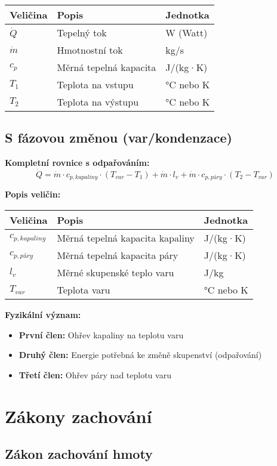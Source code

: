 \documentclass[11pt,a4paper]{article}
\begin{document}
\begin{longtable}{lll}
\toprule
Veličina & Popis & Jednotka \\
\midrule
$\dot{Q}$ & Tepelný tok & W (Watt) \\
$\dot{m}$ & Hmotnostní tok & kg/s \\
$c_p$ & Měrná tepelná kapacita & J/(kg·K) \\
$T_1$ & Teplota na vstupu & °C nebo K \\
$T_2$ & Teplota na výstupu & °C nebo K \\
\bottomrule
\end{longtable}

\subsection{S fázovou změnou (var/kondenzace)}

\textbf{Kompletní rovnice s odpařováním:}
\[\dot{Q} = \dot{m} \cdot c_{p,kapaliny} \cdot (T_{var} - T_1) + \dot{m} \cdot l_v + \dot{m} \cdot c_{p,páry} \cdot (T_2 - T_{var})\]

\textbf{Popis veličin:}

\begin{longtable}{lll}
\toprule
Veličina & Popis & Jednotka \\
\midrule
$c_{p,kapaliny}$ & Měrná tepelná kapacita kapaliny & J/(kg·K) \\
$c_{p,páry}$ & Měrná tepelná kapacita páry & J/(kg·K) \\
$l_v$ & Měrné skupenské teplo varu & J/kg \\
$T_{var}$ & Teplota varu & °C nebo K \\
\bottomrule
\end{longtable}

\textbf{Fyzikální význam:}
\begin{itemize}
\item \textbf{První člen:} Ohřev kapaliny na teplotu varu
\item \textbf{Druhý člen:} Energie potřebná ke změně skupenství (odpařování)
\item \textbf{Třetí člen:} Ohřev páry nad teplotu varu
\end{itemize}

\clearpage

\section{Zákony zachování}

\subsection{Zákon zachování hmoty}
\end{document}

